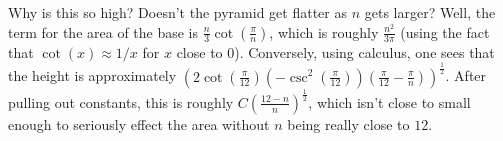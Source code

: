 \documentclass[11pt]{article}
\theoremstyle{definition}
\begin{document}
Why is this so high?  Doesn't the pyramid get flatter as $n$ gets larger?  Well, the term for the area of the base is $\frac{n}{3}\cot\left(\frac{\pi}{n}\right)$, which is roughly $\frac{n^2}{3\pi}$ (using the fact that $\cot(x) \approx 1/x$ for $x$ close to $0$).  Conversely, using calculus, one sees that the height is approximately $\left(2\cot\left(\frac{\pi}{12}\right)\left(-\csc^2\left(\frac{\pi}{12}\right)\right)\left(\frac{\pi}{12} - \frac{\pi}{n}\right)\right)^{\frac{1}{2}}$.  After pulling out constants, this is roughly $C\left(\frac{12-n}{n}\right)^{\frac{1}{2}}$, which isn't close to small enough to seriously effect the area without $n$ being really close to $12$.
\end{document}
